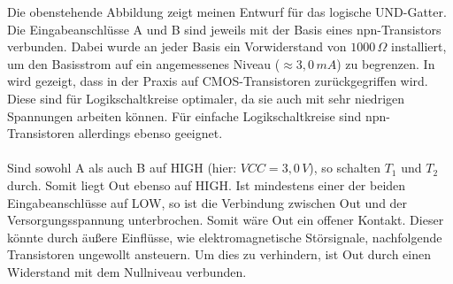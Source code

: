 Die obenstehende Abbildung zeigt meinen Entwurf für das logische UND-Gatter. Die Eingabeanschlüsse A und B sind jeweils mit der Basis eines npn-Transistors verbunden. Dabei wurde an jeder Basis ein Vorwiderstand von $1000\,\Omega$ installiert, um den Basisstrom auf ein angemessenes Niveau ($\approx 3,0\, mA$) zu begrenzen. In \cite{zimmermann1998binary} wird gezeigt, dass in der Praxis auf \glqq{}CMOS\grqq{}-Transistoren zurückgegriffen wird. Diese sind für Logikschaltkreise optimaler, da sie auch mit sehr niedrigen Spannungen arbeiten können. Für einfache Logikschaltkreise sind npn-Transistoren allerdings ebenso geeignet.\\\\
Sind sowohl A als auch B auf HIGH (hier: $VCC=3,0\,V$), so schalten $T_1$ und $T_2$ durch. Somit liegt Out ebenso auf HIGH. Ist mindestens einer der beiden Eingabeanschlüsse auf LOW, so ist die Verbindung zwischen Out und der Versorgungsspannung unterbrochen. Somit wäre Out ein offener Kontakt. Dieser könnte durch äußere Einflüsse, wie elektromagnetische Störsignale, nachfolgende Transistoren ungewollt ansteuern. Um dies zu verhindern, ist Out durch einen Widerstand mit dem Nullniveau verbunden.\\
